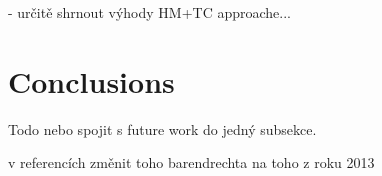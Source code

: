 \documentclass[11pt]{article}
\newcommand{\red}[1]{{\color{red} #1}}
\begin{document}
\begin{article}
{- určitě shrnout výhody HM+TC approache...


}

%
%
%

%
%
%

%
%
%

\section{Conclusions}
Todo nebo spojit s future work do jedný subsekce.


\red{v referencích změnit toho barendrechta na toho z roku 2013}




\end{article}
\end{document}
